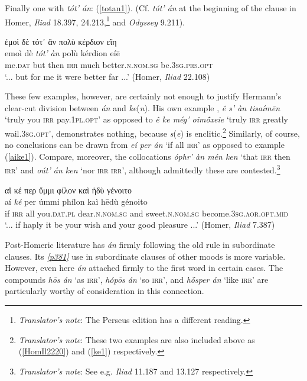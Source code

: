 Finally one with \textit{tót' án}: (\ref{totan1}). (Cf. \textit{tót' án} at the beginning of the clause in Homer, \textit{Iliad} 18.397, 24.213,\footnote{\emph{Translator's note}: The Perseus edition has a different reading.} and \textit{Odyssey} 9.211).

\begin{exe}
\ex ἐμοὶ δὲ τότ᾽ ἂν πολὺ κέρδιον εἴη\\
\gll emoì dè \emph{tót'} \emph{àn} polù kérdion eíē\\
me.\textsc{dat} but then \textsc{irr} much better.\textsc{n.nom.sg}
be.\textsc{3sg.prs.opt}\\
\trans `... but for me it were better far ...' (Homer, \textit{Iliad} 22.108)
\label{totan1}
\end{exe}

These few examples, however, are certainly not enough to justify Hermann's clear-cut division between \emph{án} and \emph{ke}(\emph{n}). His own example \citep[7]{Hermann1831}, \textit{ê s' àn tisaímēn} `truly you \textsc{irr} pay.\textsc{1pl.opt}' as opposed to \textit{ê ke még' oimṓxeie} `truly \textsc{irr} greatly wail.\textsc{3sg.opt}', demonstrates nothing, because \emph{s}(\emph{e}) is enclitic.\footnote{\emph{Translator's note}: These two examples are also included above as (\ref{HomIl2220}) and (\ref{ke1}) respectively.} Similarly, of course, no conclusions can be drawn from \textit{eí per án} `if all \textsc{irr}' as opposed to example (\ref{aike1}). Compare, moreover, the collocations \textit{óphr' àn mén ken} `that \textsc{irr} then \textsc{irr}' and \textit{oút' án ken} `nor \textsc{irr} \textsc{irr}', although admittedly these are contested.\footnote{\emph{Translator's note}: See e.g. \textit{Iliad} 11.187 and 13.127 respectively.}

\begin{exe}
\ex αἴ κέ περ ὔμμι φίλον καὶ ἡδὺ γένοιτο\\
\gll aí \emph{ké} per úmmi phílon kaì hēdù génoito\\
if \textsc{irr} all you.\textsc{dat.pl} dear.\textsc{n.nom.sg} and sweet.\textsc{n.nom.sg} become.\textsc{3sg.aor.opt.mid}\\
\trans `... if haply it be your wish and your good pleasure ...' (Homer, \textit{Iliad} 7.387)
\label{aike1}
\end{exe}

Post-Homeric literature has \emph{án} firmly following the old rule in  subordinate clauses. Its \hyperlink{p381}{\emph{[p381]}} use in subordinate clauses of other moods is more variable. However, even here \emph{án} attached firmly to the first word in certain cases. The compounds \textit{hōs án} `as \textsc{irr}', \textit{hópōs án} `so \textsc{irr}', and \textit{hṓsper án} `like \textsc{irr}' are particularly worthy of consideration in this connection.

